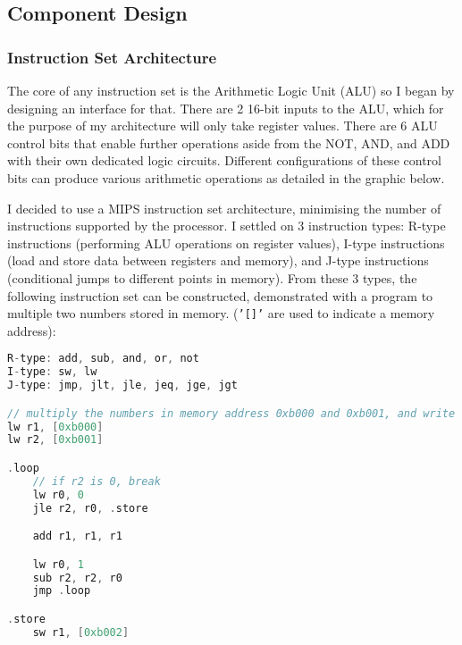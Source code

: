 \bigskip


\subsection{Component Design}
\subsubsection{Instruction Set Architecture}
\label{sec:ISADesign}
The core of any instruction set is the Arithmetic Logic Unit (ALU) so I began by designing an interface for that. There are 2 16-bit inputs to the ALU, which for the purpose of my architecture will only take register values. There are 6 ALU control bits that enable further operations aside from the NOT, AND, and ADD with their own dedicated logic circuits. Different configurations of these control bits can produce various arithmetic operations as detailed in the graphic below.

\bigskip


\bigskip

I decided to use a MIPS instruction set architecture, minimising the number of instructions supported by the processor. I settled on 3 instruction types: R-type instructions (performing ALU operations on register values), I-type instructions (load and store data between registers and memory), and J-type instructions (conditional jumps to different points in memory). From these 3 types, the following instruction set can be constructed, demonstrated with a program to multiple two numbers stored in memory. (\texttt{'[]'} are used to indicate a memory address):

\begin{lstlisting}[language=C]
R-type: add, sub, and, or, not
I-type: sw, lw
J-type: jmp, jlt, jle, jeq, jge, jgt

// multiply the numbers in memory address 0xb000 and 0xb001, and write the answer to 0xb002
lw r1, [0xb000]
lw r2, [0xb001]

.loop
    // if r2 is 0, break
    lw r0, 0
    jle r2, r0, .store

    add r1, r1, r1

    lw r0, 1
    sub r2, r2, r0
    jmp .loop

.store
    sw r1, [0xb002]
\end{lstlisting}